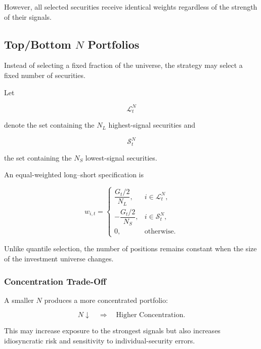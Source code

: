 \documentclass[11pt,a4paper]{article}
\begin{document}
However, all selected securities receive identical weights regardless of the
strength of their signals.


\subsection{Top/Bottom $N$ Portfolios}
\label{subsec:top_bottom_n}

Instead of selecting a fixed fraction of the universe, the strategy may select
a fixed number of securities.

Let

\begin{equation}
\mathcal{L}_t^{N}
\end{equation}

denote the set containing the $N_L$ highest-signal securities and

\begin{equation}
\mathcal{S}_t^{N}
\end{equation}

the set containing the $N_S$ lowest-signal securities.

An equal-weighted long--short specification is

\begin{equation}
\boxed{
w_{i,t}
=
\begin{cases}
\dfrac{G_t/2}{N_L},
&
i\in\mathcal{L}_t^{N},
\\[0.30cm]
-\dfrac{G_t/2}{N_S},
&
i\in\mathcal{S}_t^{N},
\\[0.30cm]
0,
&
\text{otherwise}.
\end{cases}
}
\end{equation}

Unlike quantile selection, the number of positions remains constant when the
size of the investment universe changes.


\subsubsection{Concentration Trade-Off}

A smaller $N$ produces a more concentrated portfolio:

\begin{equation}
N\downarrow
\quad\Rightarrow\quad
\text{Higher Concentration}.
\end{equation}

This may increase exposure to the strongest signals but also increases
idiosyncratic risk and sensitivity to individual-security errors.
\end{document}
